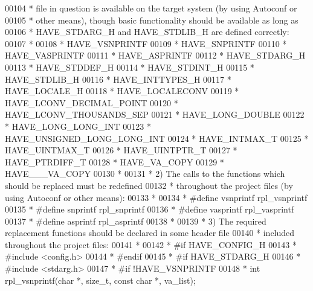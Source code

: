 \begin{DoxyCode}
{00104 \textcolor{comment}{ *    file in question is available on the target system (by using Autoconf or}
00105 \textcolor{comment}{ *    other means), though basic functionality should be available as long as}
00106 \textcolor{comment}{ *    HAVE\_STDARG\_H and HAVE\_STDLIB\_H are defined correctly:}
00107 \textcolor{comment}{ *}
00108 \textcolor{comment}{ *      HAVE\_VSNPRINTF}
00109 \textcolor{comment}{ *      HAVE\_SNPRINTF}
00110 \textcolor{comment}{ *      HAVE\_VASPRINTF}
00111 \textcolor{comment}{ *      HAVE\_ASPRINTF}
00112 \textcolor{comment}{ *      HAVE\_STDARG\_H}
00113 \textcolor{comment}{ *      HAVE\_STDDEF\_H}
00114 \textcolor{comment}{ *      HAVE\_STDINT\_H}
00115 \textcolor{comment}{ *      HAVE\_STDLIB\_H}
00116 \textcolor{comment}{ *      HAVE\_INTTYPES\_H}
00117 \textcolor{comment}{ *      HAVE\_LOCALE\_H}
00118 \textcolor{comment}{ *      HAVE\_LOCALECONV}
00119 \textcolor{comment}{ *      HAVE\_LCONV\_DECIMAL\_POINT}
00120 \textcolor{comment}{ *      HAVE\_LCONV\_THOUSANDS\_SEP}
00121 \textcolor{comment}{ *      HAVE\_LONG\_DOUBLE}
00122 \textcolor{comment}{ *      HAVE\_LONG\_LONG\_INT}
00123 \textcolor{comment}{ *      HAVE\_UNSIGNED\_LONG\_LONG\_INT}
00124 \textcolor{comment}{ *      HAVE\_INTMAX\_T}
00125 \textcolor{comment}{ *      HAVE\_UINTMAX\_T}
00126 \textcolor{comment}{ *      HAVE\_UINTPTR\_T}
00127 \textcolor{comment}{ *      HAVE\_PTRDIFF\_T}
00128 \textcolor{comment}{ *      HAVE\_VA\_COPY}
00129 \textcolor{comment}{ *      HAVE\_\_\_VA\_COPY}
00130 \textcolor{comment}{ *}
00131 \textcolor{comment}{ * 2) The calls to the functions which should be replaced must be redefined}
00132 \textcolor{comment}{ *    throughout the project files (by using Autoconf or other means):}
00133 \textcolor{comment}{ *}
00134 \textcolor{comment}{ *      #define vsnprintf rpl\_vsnprintf}
00135 \textcolor{comment}{ *      #define snprintf rpl\_snprintf}
00136 \textcolor{comment}{ *      #define vasprintf rpl\_vasprintf}
00137 \textcolor{comment}{ *      #define asprintf rpl\_asprintf}
00138 \textcolor{comment}{ *}
00139 \textcolor{comment}{ * 3) The required replacement functions should be declared in some header file}
00140 \textcolor{comment}{ *    included throughout the project files:}
00141 \textcolor{comment}{ *}
00142 \textcolor{comment}{ *      #if HAVE\_CONFIG\_H}
00143 \textcolor{comment}{ *      #include <config.h>}
00144 \textcolor{comment}{ *      #endif}
00145 \textcolor{comment}{ *      #if HAVE\_STDARG\_H}
00146 \textcolor{comment}{ *      #include <stdarg.h>}
00147 \textcolor{comment}{ *      #if !HAVE\_VSNPRINTF}
00148 \textcolor{comment}{ *      int rpl\_vsnprintf(char *, size\_t, const char *, va\_list);}
}
\end{DoxyCode}

